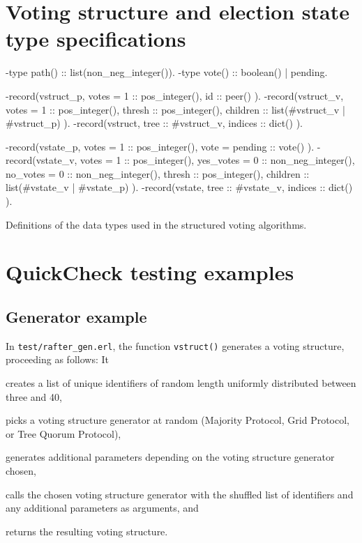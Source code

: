 \documentclass[11pt,chapterprefix=true,toc=bibliography,numbers=noendperiod,
               footnotes=multiple,twoside]{scrreprt}
\begin{document}
\newpage

\section{Voting structure and election state type specifications\label{sc:voting-types}}

\begin{listing}[h]
    \begin{erlangcode}
-type path() :: list(non_neg_integer()).
-type vote() :: boolean() | pending.

-record(vstruct_p, {
          votes = 1 :: pos_integer(),
          id :: peer()
}).
-record(vstruct_v, {
          votes = 1 :: pos_integer(),
          thresh :: pos_integer(),
          children :: list(#vstruct_v{} | #vstruct_p{})
}).
-record(vstruct, {
          tree :: #vstruct_v{},
          indices :: dict()
}).

-record(vstate_p, {
          votes = 1 :: pos_integer(),
          vote = pending :: vote()
}).
-record(vstate_v, {
          votes = 1 :: pos_integer(),
          yes_votes = 0 :: non_neg_integer(),
          no_votes = 0 :: non_neg_integer(),
          thresh :: pos_integer(),
          children :: list(#vstate_v{} | #vstate_p{})
}).
-record(vstate, {
          tree :: #vstate_v{},
          indices :: dict()
}).
    \end{erlangcode}
    \caption{Definitions of the data types used in the structured voting algorithms.}
    \label{lst:voting-types}
\end{listing}

\section{QuickCheck testing examples\label{sc:testing-examples}}

\subsection{Generator example\label{ssc:generator}}

In \texttt{test/rafter\_gen.erl}, the function \texttt{vstruct()} generates a voting structure, proceeding as follows: It
\begin{inparaenum}[(a)]
    \item creates a list of unique identifiers of random length uniformly distributed between three and 40,
    \item picks a voting structure generator at random (Majority Protocol, Grid Protocol, or Tree Quorum Protocol),
    \item generates additional parameters depending on the voting structure generator chosen,
    \item calls the chosen voting structure generator with the shuffled list of identifiers and any additional parameters as arguments, and
    \item returns the resulting voting structure.
\end{inparaenum}
\end{document}
